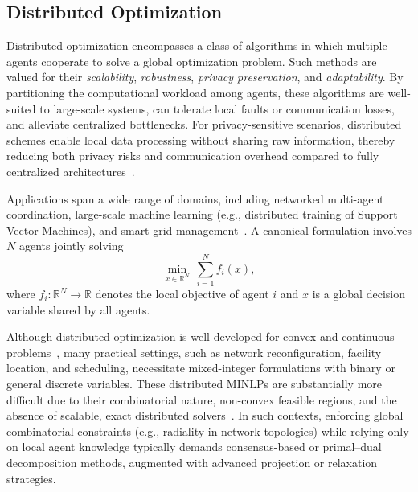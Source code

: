 \documentclass[11pt,a4paper]{article}
\theoremstyle{plain}
\theoremstyle{definition}
\theoremstyle{remark}
\begin{document}
	
	\subsection{Distributed Optimization}
	Distributed optimization encompasses a class of algorithms in which multiple agents cooperate to solve a global optimization problem. Such methods are valued for their \emph{scalability}, \emph{robustness}, \emph{privacy preservation}, and \emph{adaptability}. By partitioning the computational workload among agents, these algorithms are well-suited to large-scale systems, can tolerate local faults or communication losses, and alleviate centralized bottlenecks. For privacy-sensitive scenarios, distributed schemes enable local data processing without sharing raw information, thereby reducing both privacy risks and communication overhead compared to fully centralized architectures~\cite{molzahn2017survey,yang2019survey}.
	
	Applications span a wide range of domains, including networked multi-agent coordination, large-scale machine learning (e.g., distributed training of Support Vector Machines), and smart grid management~\cite{lin2003multi,cortes1995support,molzahn2017survey,nabavi2015distributed,mokhtari2025distributed}. A canonical formulation involves $N$ agents jointly solving
	\begin{equation}
		\underset{x \in \mathbb{R}^{N}}{\min} \ \sum_{i=1}^{N} f_{i}(x),
		\label{consensus}
	\end{equation}
	where $f_i : \mathbb{R}^N \to \mathbb{R}$ denotes the local objective of agent $i$ and $x$ is a global decision variable shared by all agents.
	
	Although distributed optimization is well-developed for convex and continuous problems~\cite{boyd2011distributed}, many practical settings, such as network reconfiguration, facility location, and scheduling, necessitate mixed-integer formulations with binary or general discrete variables. These distributed MINLPs are substantially more difficult due to their combinatorial nature, non-convex feasible regions, and the absence of scalable, exact distributed solvers~\cite{camisa2021distributed,camisa2022distributed}. In such contexts, enforcing global combinatorial constraints (e.g., radiality in network topologies) while relying only on local agent knowledge typically demands consensus-based or primal–dual decomposition methods, augmented with advanced projection or relaxation strategies. 
	
\end{document}
